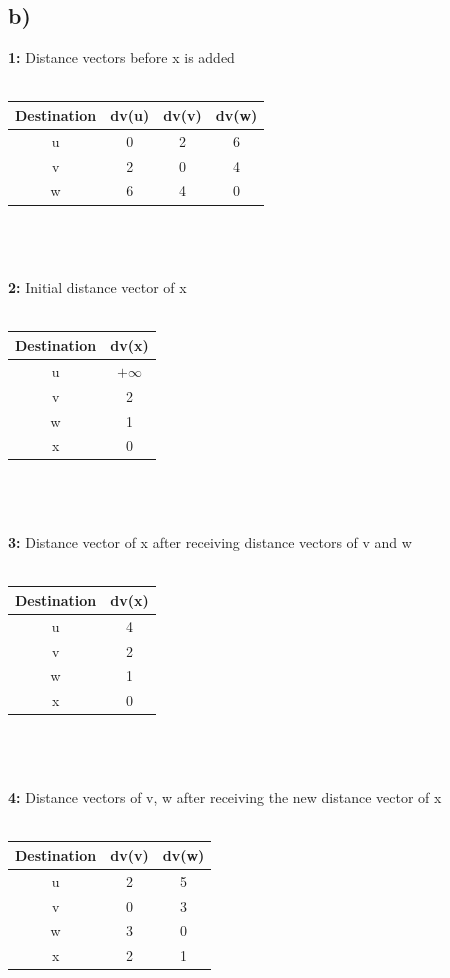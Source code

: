 \documentclass[12pt, a4paper]{article}
\begin{document}
\subsection*{b)}
\textbf{1:} Distance vectors before x is added \\ \\
    \begin{tabular}{||c c c c||} 
     \hline
     Destination & dv(u) & dv(v) & dv(w) \\ [0.5ex] 
     \hline\hline
     u & 0 & 2 & 6 \\ 
     \hline
     v & 2 & 0 & 4 \\
     \hline
     w & 6 & 4 & 0 \\
     \hline
    \end{tabular} \\ \\ \\
\textbf{2:} Initial distance vector of x \\ \\
    \begin{tabular}{||c c||} 
     \hline
     Destination & dv(x) \\ [0.5ex] 
     \hline\hline
     u & \(+\infty\) \\ 
     \hline
     v & 2 \\
     \hline
     w & 1 \\
     \hline
     x & 0 \\
     \hline
    \end{tabular} \\ \\ \\
\textbf{3:} Distance vector of x after receiving distance vectors of v and w \\ \\
    \begin{tabular}{||c c||} 
     \hline
     Destination & dv(x) \\ [0.5ex] 
     \hline\hline
     u & 4 \\ 
     \hline
     v & 2 \\
     \hline
     w & 1 \\
     \hline
     x & 0 \\
     \hline
    \end{tabular} \\ \\ \\
\textbf{4:} Distance vectors of v, w after receiving the new distance vector of x \\ \\
    \begin{tabular}{||c c c||} 
     \hline
     Destination & dv(v) & dv(w) \\ [0.5ex] 
     \hline\hline
     u & 2 & 5 \\ 
     \hline
     v & 0 & 3 \\
     \hline
     w & 3 & 0 \\
     \hline
     x & 2 & 1 \\
     \hline
    \end{tabular} \\ \\ \\
\end{document}
